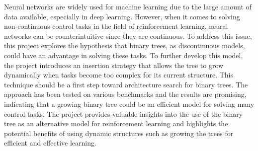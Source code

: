 
Neural networks are widely used for machine learning due to the large amount of data available, especially in deep learning. However, when it comes to solving non-continuous control tasks in the field of reinforcement learning, neural networks can be counterintuitive since they are continuous. To address this issue, this project explores the hypothesis that binary trees, as discontinuous models, could have an advantage in solving these tasks. To further develop this model, the project introduces an insertion strategy that allows the tree to grow dynamically when tasks become too complex for its current structure. This technique should be a first step toward architecture search for binary trees. The approach has been tested on various benchmarks and the results are promising, indicating that a growing binary tree could be an efficient model for solving many control tasks. The project provides valuable insights into the use of the binary tree as an alternative model for reinforcement learning and highlights the potential benefits of using dynamic structures such as growing the trees for efficient and effective learning.